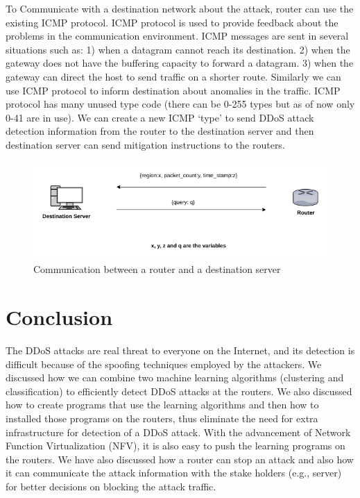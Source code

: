 \documentclass[12pt,oneside,a4paper]{article}
\begin{document}
To Communicate with a destination network about the attack, router can use the existing ICMP protocol. ICMP protocol is used to provide feedback about the problems in the communication environment. ICMP messages are sent in several situations such as: 1) when a datagram cannot reach its destination. 2) when the gateway does not have the buffering capacity to forward a datagram. 3) when the gateway can direct the host to send traffic on a shorter route.\cite{icmp} Similarly we can use ICMP protocol to inform destination about anomalies in the traffic. ICMP protocol has many unused type code (there can be 0-255 types but as of now only 0-41 are in use). We can create a new ICMP `type' to send DDoS attack detection information from the router to the destination server and then destination server can send mitigation instructions to the routers.

\begin{figure}[H]
\centering
\includegraphics[scale=0.5]{router-network-communication.png}
\caption{Communication between a router and a destination server} \label{fig:router-network-communication}
\end{figure}

\pagebreak
\section{Conclusion}

The DDoS attacks are real threat to everyone on the Internet, and its detection is difficult because of the spoofing techniques employed by the attackers. We discussed how we can combine two machine learning algorithms (clustering and classification) to efficiently detect DDoS attacks at the routers. We also discussed how to create programs that use the learning algorithms and then how to installed those programs on the routers, thus eliminate the need for extra infrastructure for detection of a DDoS attack. With the advancement of Network Function Virtualization (NFV), it is also easy to push the learning programs on the routers. We have also discussed how a router can stop an attack and also how it can communicate the attack information with the stake holders (e.g., server) for better decisions on blocking the attack traffic.

\pagebreak

\singlespacing
\end{document}
